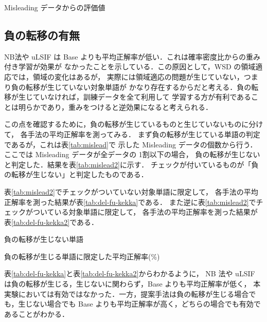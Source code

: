 \documentclass[japanese]{jnlp_1.4}
\begin{document}
\begin{table}[t]
\caption{Misleading データからの評価値}
\label{tab:miseval}

\end{table}



\subsection{負の転移の有無}

NB法や uLSIF は Base よりも平均正解率が低い．これは確率密度比からの重み付き学習が効果が
なかったことを示している．この原因として，WSD の領域適応では，領域の変化はあるが，
実際には領域適応の問題が生じていない，つまり負の転移\cite{rosenstein2005transfer}が生じていない対象単語が
かなり存在するからだと考える．負の転移が生じていなければ，訓練データを全て利用して
学習する方が有利であることは明らかであり，重みをつけると逆効果になると考えられる．

この点を確認するために，負の転移が生じているものと生じていないものに分けて，
各手法の平均正解率を測ってみる．
まず負の転移が生じている単語の判定であるが，これは\mbox{表\ref{tab:mislead}}で
示した Misleading データの個数から行う．ここでは Misleading データが全データの 1割以下の場合，
負の転移が生じないと判定した．結果を\mbox{表\ref{tab:mislead2}}に示す．
チェックが付いているものが「負の転移が生じない」と判定したものである．

\mbox{表\ref{tab:mislead2}}でチェックがついていない対象単語に限定して，
各手法の平均正解率を測った結果が\mbox{表\ref{tab:del-fu-kekka}}である．
また逆に\mbox{表\ref{tab:mislead2}}でチェックがついている対象単語に限定して，
各手法の平均正解率を測った結果が\mbox{表\ref{tab:del-fu-kekka2}}である．

\begin{table}[t]
\caption{負の転移が生じない単語}
\label{tab:mislead2}

\end{table}
\begin{table}[t]
\caption{負の転移が生じる単語に限定した平均正解率(\%)}
\label{tab:del-fu-kekka}

\end{table}

\mbox{表\ref{tab:del-fu-kekka}}と\mbox{表\ref{tab:del-fu-kekka2}}からわかるように，
NB 法や uLSIF は負の転移が生じる，生じないに関わらず，Base よりも平均正解率が低く，
本実験においては有効ではなかった．一方，提案手法は負の転移が生じる場合でも，生じない場合でも
Base よりも平均正解率が高く，どちらの場合でも有効であることがわかる．
\end{document}

